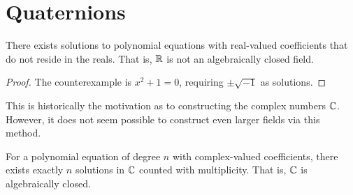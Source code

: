 \section{Quaternions}

\begin{lemma}
    There exists solutions to polynomial equations with real-valued coefficients
    that do not reside in the reals.
    That is, \(\mathbb{R}\) is not an algebraically closed field.
\end{lemma}
\begin{proof}
    The counterexample is \(x^2 + 1 = 0\),
    requiring \(\pm\sqrt{-1}\) as solutions.
\end{proof}
\begin{remark}
    This is historically the motivation
    as to constructing the complex numbers \(\mathbb{C}\).
    However, it does not seem possible to construct
    even larger fields via this method.
\end{remark}
\begin{theorem}\label{thm:fta}
    For a polynomial equation of degree \(n\) with complex-valued coefficients,
    there exists exactly \(n\) solutions in \(\mathbb{C}\) counted with multiplicity.
    That is, \(\mathbb{C}\) is algebraically closed.
\end{theorem}
